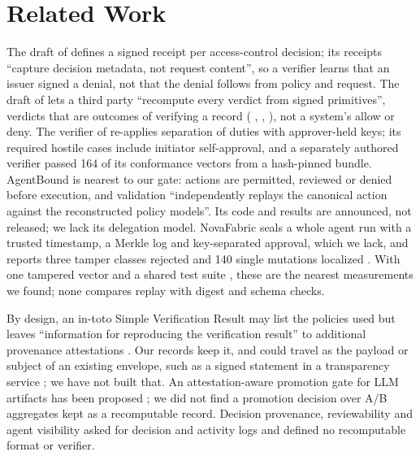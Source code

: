 \documentclass[letterpaper]{article} %
\makeatletter
\def\code@keepspaces{\Url@Edit\Url@String{ }{+}}}
\DeclareRobustCommand{\code}{\leavevmode\begingroup \urlstyle{tt}%
  \let\Url@ObeySp\code@keepspaces \def\Url@space{\penalty\UrlBreakPenalty\ }\Url}
\makeatother
\begin{document}
\section{Related Work}
\label{sec:related}

The draft of \citet{farley2026acta} defines a signed receipt per
access-control decision; its receipts ``capture decision metadata, not
request content'', so a verifier learns that an issuer signed a denial, not
that the denial follows from policy and request. The draft of
\citet{msebenzi2026evidence} lets a third party ``recompute every verdict
from signed primitives'', verdicts that are outcomes of verifying a record
(\code{VALID}, \code{INVALID}, \code{UNVERIFIABLE}), not a system's allow or
deny. The verifier of \citet{schrock2026authorization} re-applies separation
of duties with approver-held keys; its required hostile cases include
initiator self-approval, and a separately authored verifier passed 164 of
its conformance vectors from a hash-pinned bundle. AgentBound
\citep{kaul2026agentbound} is nearest to our gate: actions are permitted,
reviewed or denied before execution, and validation ``independently replays
the canonical action against the reconstructed policy models''. Its code and
results are announced, not released; we lack its delegation model.
NovaFabric seals a whole agent run with a trusted timestamp, a Merkle log
and key-separated approval, which we lack, and reports three tamper classes
rejected and 140 single mutations localized \citep{ardebili2026novafabric}.
With one tampered vector \citep{msebenzi2026evidence} and a shared test
suite \citep{farley2026acta}, these are the nearest measurements we found;
none compares replay with digest and schema checks.

By design, an in-toto Simple Verification Result may list the policies used but
leaves ``information for reproducing the verification result'' to additional
provenance attestations \citep{hennen2026svr}.
Our records keep it, and could travel as the payload or subject of an existing envelope, such as a
signed statement in a transparency service \citep{birkholz2026scitt}; we
have not built that. An attestation-aware promotion gate for LLM artifacts
has been proposed \citep{tan2026attesting}; we did not find a promotion
decision over A/B aggregates kept as a recomputable record. Decision
provenance, reviewability and agent visibility asked for decision and
activity logs \citep{singh2019decision,cobbe2021reviewable,chan2024visibility}
and defined no recomputable format or verifier.
\end{document}
